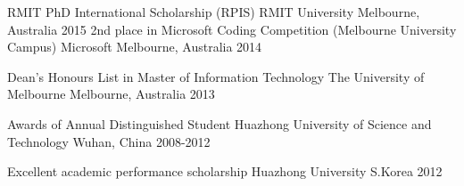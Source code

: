 


\begin{cvhonors}


\cvhonor
{RMIT PhD International Scholarship (RPIS)} %
{RMIT University} %
{Melbourne, Australia} %
{2015} %
\cvhonor
{2nd place in Microsoft Coding Competition (Melbourne University Campus)}
{Microsoft}
{Melbourne, Australia}
{2014}

\cvhonor
{Dean's Honours List in Master of Information Technology} %
{The University of Melbourne} %
{Melbourne, Australia} %
{2013} %


\cvhonor
{Awards of Annual Distinguished Student} %
{Huazhong University of Science and Technology} %
{Wuhan, China} %
{2008-2012} %


\cvhonor
{Excellent academic performance scholarship} %
{Huazhong University} %
{S.Korea} %
{2012} %


\end{cvhonors}